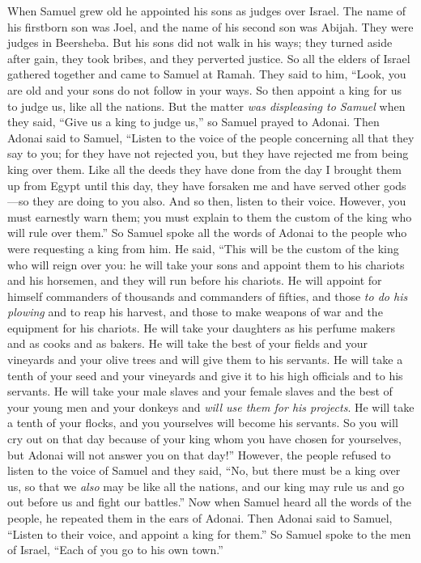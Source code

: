 \begin{biblechapter} %
 When Samuel grew old he appointed his sons as judges over Israel.
\verse The name of his firstborn son was Joel, and the name of his second son was Abijah. They were judges in Beersheba.
\verse But his sons did not walk in his ways; they turned aside after gain, they took bribes, and they perverted justice.
\verse So all the elders of Israel gathered together and came to Samuel at Ramah.
\verse They said to him, “Look, you are old and your sons do not follow in your ways. So then appoint a king for us to judge us, like all the nations.
\verse But the matter \textit{was displeasing to Samuel} when they said, “Give us a king to judge us,” so Samuel prayed to Adonai.
\verse Then Adonai said to Samuel, “Listen to the voice of the people concerning all that they say to you; for they have not rejected you, but they have rejected me from being king over them.
\verse Like all the deeds they have done from the day I brought them up from Egypt until this day, they have forsaken me and have served other gods—so they are doing to you also.
\verse And so then, listen to their voice. However, you must earnestly warn them; you must explain to them the custom of the king who will rule over them.”
\verse So Samuel spoke all the words of Adonai to the people who were requesting a king from him.
\verse He said, “This will be the custom of the king who will reign over you: he will take your sons and appoint them to his chariots and his horsemen, and they will run before his chariots.
\verse He will appoint for himself commanders of thousands and commanders of fifties, and those \textit{to do his plowing} and to reap his harvest, and those to make weapons of war and the equipment for his chariots.
\verse He will take your daughters as his perfume makers and as cooks and as bakers.
\verse He will take the best of your fields and your vineyards and your olive trees and will give them to his servants.
\verse He will take a tenth of your seed and your vineyards and give it to his high officials and to his servants.
\verse He will take your male slaves and your female slaves and the best of your young men and your donkeys and \textit{will use them for his projects}.
\verse He will take a tenth of your flocks, and you yourselves will become his servants.
\verse So you will cry out on that day because of your king whom you have chosen for yourselves, but Adonai will not answer you on that day!”
\verse However, the people refused to listen to the voice of Samuel and they said, “No, but there must be a king over us,
\verse so that we \textit{also} may be like all the nations, and our king may rule us and go out before us and fight our battles.”
\verse Now when Samuel heard all the words of the people, he repeated them in the ears of Adonai.
\verse Then Adonai said to Samuel, “Listen to their voice, and appoint a king for them.” So Samuel spoke to the men of Israel, “Each of you go to his own town.”
\end{biblechapter}

